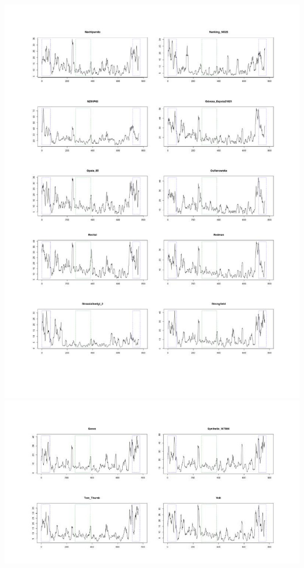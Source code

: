 \documentclass[a4paper, 12pt]{article}
\begin{document}
\begin{onehalfspace}
\begin{center}
\includegraphics[scale=0.64]{pic_Data/ane2-4.jpg}\\
\thispagestyle{empty}
\includegraphics[scale=0.64]{pic_Data/ane2-5.jpg}\\
\thispagestyle{empty}
\end{center}


\end{onehalfspace}
\end{document}
